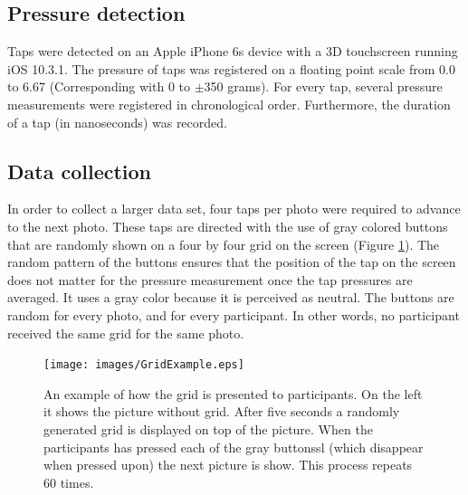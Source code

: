 \documentclass{sigchi}
\begin{document}

\subsection{Pressure detection} %
\label{sub:pressure_detection}
Taps were detected on an Apple iPhone 6s device with a 3D touchscreen running iOS 10.3.1. The pressure of taps was registered on a floating point scale from 0.0 to 6.67 (Corresponding with 0 to $\pm$350 grams). For every tap, several pressure measurements were registered in chronological order. Furthermore, the duration of a tap (in nanoseconds) was recorded.

\subsection{Data collection} %
\label{sub:data_collection}
In order to collect a larger data set, four taps per photo were required to advance to the next photo. These taps are directed with the use of gray colored buttons that are randomly shown on a four by four grid on the screen (Figure \ref{fig:grid}). The random pattern of the buttons ensures that the position of the tap on the screen does not matter for the pressure measurement once the tap pressures are averaged. It uses a gray color because it is perceived as neutral. The buttons are random for every photo, and for every participant. In other words, no participant received the same grid for the same photo.
\begin{figure}[t]
    \centering
    \texttt{[image: images/GridExample.eps]}
    \caption{An example of how the grid is presented to participants. On the left it shows the picture without grid. After five seconds a randomly generated grid is displayed on top of the picture. When the participants has pressed each of the gray buttonssl (which disappear when pressed upon) the next picture is show. This process repeats 60 times.}
    \label{fig:grid}
\end{figure}
\end{document}
